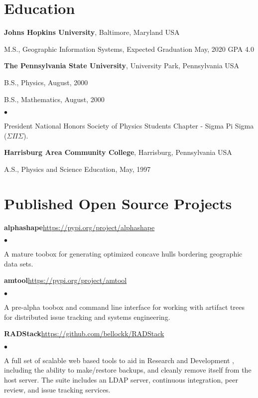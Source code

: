 \documentclass[margin,line]{res}
\newenvironment{list1}{
  \begin{list}{\ding{113}}{%
      \setlength{\itemsep}{0in}
      \setlength{\parsep}{0in} \setlength{\parskip}{0in}
      \setlength{\topsep}{0in} \setlength{\partopsep}{0in} 
      \setlength{\leftmargin}{0.17in}}}{\end{list}}
\newenvironment{list2}{%
  \begin{list}{$\bullet$}{%
      \setlength{\itemsep}{0in}
      \setlength{\parsep}{0in} \setlength{\parskip}{0in}
      \setlength{\topsep}{0in} \setlength{\partopsep}{0in} 
  \setlength{\leftmargin}{0.2in}}}{\end{list}}
\newcommand{\organization}[2] {{\bf #1}, #2\par}
\begin{document}
\begin{resume}
\section{\sc Education}

\organization{Johns Hopkins University}{Baltimore, Maryland USA}
\begin{list1}
  \item[] M.S., Geographic Information Systems, Expected Graduation May, 2020 \hfill GPA 4.0
\end{list1}

\organization{The Pennsylvania State University}{University Park, Pennsylvania USA}
\begin{list1}
  \item[] B.S., Physics, August, 2000
  \item[] B.S., Mathematics, August, 2000
  \begin{list2}\vspace*{.05in}
\item President National Honors Society of Physics Students Chapter - Sigma Pi Sigma ($\Sigma\Pi\Sigma$).
  \end{list2}\vspace*{.05in}
\end{list1}

\organization{Harrisburg Area Community College}{Harrisburg, Pennsylvania USA}
\begin{list1}
  \item[] A.S., Physics and Science Education,  May, 1997
\end{list1}

\section{\sc Published Open Source Projects}
{\bf alphashape}\hfill\url{https://pypi.org/project/alphashape}

\begin{list2}
\item A mature toobox for generating optimized concave hulls bordering geographic data sets.
\end{list2}

{\bf amtool}\hfill\url{https://pypi.org/project/amtool}

\begin{list2}
	\item A pre-alpha toobox and command line interface for working with artifact trees for distributed issue tracking and systems engineering.
\end{list2}

{\bf RADStack}\hfill\url{https://github.com/bellockk/RADStack}

\begin{list2}
	\item A full set of scalable web based tools to aid in Research and Development , including the ability to make/restore backups, and cleanly remove itself from the host server. The suite includes an LDAP server, continuous integration, peer review, and issue tracking services.
\end{list2}


\end{resume}
\end{document}
